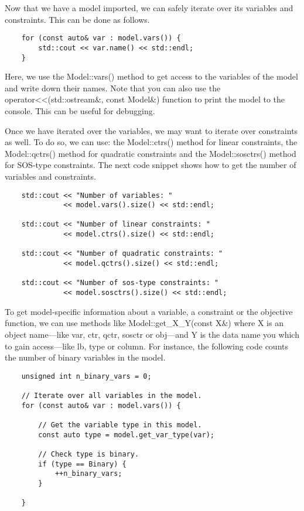 Now that we have a model imported, we can safely iterate over its variables
and constraints. This can be done as follows. 

\begin{lstlisting}
    for (const auto& var : model.vars()) {
        std::cout << var.name() << std::endl;
    }
\end{lstlisting}
Here, we use the \textsf{Model::vars()} method to get access to the variables
of the model and write down their names. Note that you can also use the
\textsf{operator<<(std::ostream\&, const Model\&)} function to print the model
to the console. This can be useful for debugging. 

Once we have iterated over the variables, we may want to iterate over
constraints as well. To do so, we can use: the \textsf{Model::ctrs()} method
for linear constraints,  the \textsf{Model::qctrs()} method for quadratic
constraints and the \textsf{Model::sosctrs()} method for SOS-type constraints.
The next code snippet shows how to get the number of variables and
constraints.

\begin{lstlisting}
    std::cout << "Number of variables: " 
              << model.vars().size() << std::endl;

    std::cout << "Number of linear constraints: "
              << model.ctrs().size() << std::endl;

    std::cout << "Number of quadratic constraints: "
              << model.qctrs().size() << std::endl;

    std::cout << "Number of sos-type constraints: "
              << model.sosctrs().size() << std::endl;
\end{lstlisting}

To get model-specific information about a variable, a constraint or the
objective function, we can use methods like \textsf{Model::get\_X\_Y(const
X\&)} where \textsf{X} is an object name---like \textsf{var}, \textsf{ctr},
\textsf{qctr}, \textsf{sosctr} or \textsf{obj}---and \textsf{Y} is the data
name you which to gain access---like \textsf{lb}, \textsf{type} or
\textsf{column}. For instance, the following code counts the number of binary
variables in the model.

\begin{lstlisting}
    unsigned int n_binary_vars = 0;

    // Iterate over all variables in the model.
    for (const auto& var : model.vars()) {

        // Get the variable type in this model.
        const auto type = model.get_var_type(var);

        // Check type is binary.
        if (type == Binary) {
            ++n_binary_vars;
        }

    }
\end{lstlisting}

